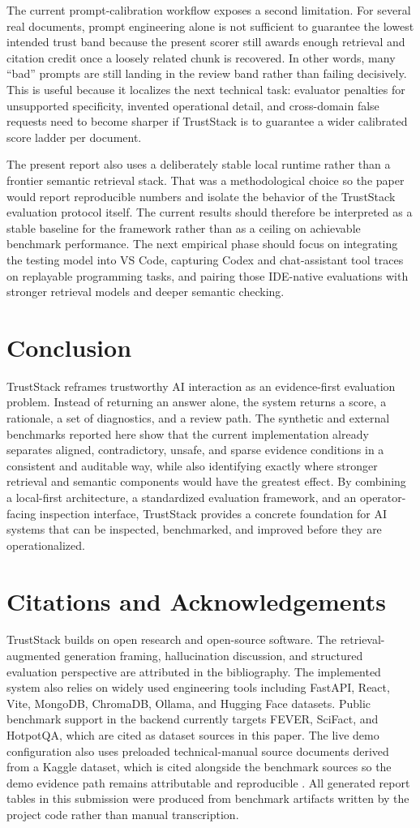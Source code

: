 \documentclass[conference]{IEEEtran}
\newcommand{\TrustSection}[1]{\section{\texorpdfstring{\textcolor{TrustStackBlue}{#1}}{#1}}}
\begin{document}
The current prompt-calibration workflow exposes a second limitation. For several real documents, prompt engineering alone is not sufficient to guarantee the lowest intended trust band because the present scorer still awards enough retrieval and citation credit once a loosely related chunk is recovered. In other words, many ``bad'' prompts are still landing in the review band rather than failing decisively. This is useful because it localizes the next technical task: evaluator penalties for unsupported specificity, invented operational detail, and cross-domain false requests need to become sharper if TrustStack is to guarantee a wider calibrated score ladder per document.

The present report also uses a deliberately stable local runtime rather than a frontier semantic retrieval stack. That was a methodological choice so the paper would report reproducible numbers and isolate the behavior of the TrustStack evaluation protocol itself. The current results should therefore be interpreted as a stable baseline for the framework rather than as a ceiling on achievable benchmark performance. The next empirical phase should focus on integrating the testing model into VS Code, capturing Codex and chat-assistant tool traces on replayable programming tasks, and pairing those IDE-native evaluations with stronger retrieval models and deeper semantic checking.

\TrustSection{Conclusion}
TrustStack reframes trustworthy AI interaction as an evidence-first evaluation problem. Instead of returning an answer alone, the system returns a score, a rationale, a set of diagnostics, and a review path. The synthetic and external benchmarks reported here show that the current implementation already separates aligned, contradictory, unsafe, and sparse evidence conditions in a consistent and auditable way, while also identifying exactly where stronger retrieval and semantic components would have the greatest effect. By combining a local-first architecture, a standardized evaluation framework, and an operator-facing inspection interface, TrustStack provides a concrete foundation for AI systems that can be inspected, benchmarked, and improved before they are operationalized.

\TrustSection{Citations and Acknowledgements}
TrustStack builds on open research and open-source software. The retrieval-augmented generation framing, hallucination discussion, and structured evaluation perspective are attributed in the bibliography. The implemented system also relies on widely used engineering tools including FastAPI, React, Vite, MongoDB, ChromaDB, Ollama, and Hugging Face datasets. Public benchmark support in the backend currently targets FEVER, SciFact, and HotpotQA, which are cited as dataset sources in this paper. The live demo configuration also uses preloaded technical-manual source documents derived from a Kaggle dataset, which is cited alongside the benchmark sources so the demo evidence path remains attributable and reproducible \cite{singh2025technicalmanuals}. All generated report tables in this submission were produced from benchmark artifacts written by the project code rather than manual transcription.



\end{document}
